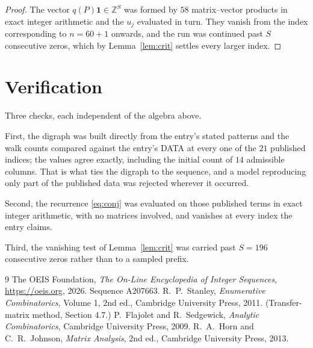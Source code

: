 \documentclass[11pt,a4paper]{article}
\theoremstyle{plain}
\theoremstyle{definition}
\begin{document}
\begin{proof}
The vector $q(P)\mathbf{1}\in\mathbb{Z}^{S}$ was formed by $58$ matrix--vector
products in exact integer arithmetic and the $u_j$ evaluated in turn. They vanish from the
index corresponding to $n=60+1$ onwards, and the run was continued past $S$ consecutive
zeros, which by Lemma~\ref{lem:crit} settles every larger index.
\end{proof}

\section{Verification}

Three checks, each independent of the algebra above.

First, the digraph was built directly from the entry's stated patterns and the walk counts
compared against the entry's DATA at every one of the $21$ published indices; the
values agree exactly, including the initial count of $14$ admissible columns. That is
what ties the digraph to the sequence, and a model reproducing only part of the published
data was rejected wherever it occurred.

Second, the recurrence \eqref{eq:conj} was evaluated on those published terms in exact
integer arithmetic, with no matrices involved, and vanishes at every index the entry claims.

Third, the vanishing test of Lemma~\ref{lem:crit} was carried past $S=196$ consecutive
zeros rather than to a sampled prefix.

\begin{thebibliography}{9}
 The OEIS Foundation, \emph{The On-Line Encyclopedia of Integer
Sequences}, \url{https://oeis.org}, 2026. Sequence A207663.
 R.~P.~Stanley, \emph{Enumerative Combinatorics}, Volume 1, 2nd ed.,
Cambridge University Press, 2011. (Transfer-matrix method, Section 4.7.)
 P.~Flajolet and R.~Sedgewick, \emph{Analytic Combinatorics}, Cambridge
University Press, 2009.
 R.~A.~Horn and C.~R.~Johnson, \emph{Matrix Analysis}, 2nd ed., Cambridge
University Press, 2013.
\end{thebibliography}
\end{document}
